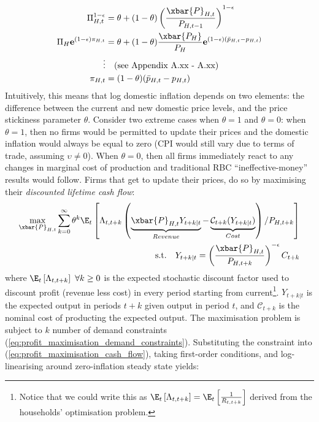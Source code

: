 \begin{align}
    \Pi_{H,t}^{1-\epsilon} &= \theta + (1-\theta)\left(\frac{\xbar{P}_{H,t}}{P_{H,t-1}}\right)^{1-\epsilon} \\
    \Pi_H \mathbf{e}^{(1-\epsilon)\pi_{H,t}} &= \theta + (1-\theta)\frac{\xbar{P_H}}{P_H}\mathbf{e}^{(1-\epsilon)(\bar{p}_{H,t} - p_{H,t})} \\
    \vdots & \quad \text{(see Appendix A.xx - A.xx)} \\
    \pi_{H,t} &= (1-\theta)(\bar{p}_{H,t} - p_{H,t}) \label{eq:domestic_inflation_new_price_relationship}
\end{align}
Intuitively, this means that log domestic inflation depends on two elements: the difference between the current and new domestic price levels, and the price stickiness parameter $\theta$. Consider two extreme cases when $\theta = 1$ and $\theta = 0$: when $\theta = 1$, then no firms would be permitted to update their prices and the domestic inflation would always be equal to zero (CPI would still vary due to terms of trade, assuming $\upsilon \ne 0$). When $\theta = 0$, then all firms immediately react to any changes in marginal cost of production and traditional RBC ``ineffective-money'' results would follow. Firms that get to update their prices, do so by maximising their \textit{discounted lifetime cash flow}:
\begin{align}
    \max_{\xbar{P}_{H,t}} \sum_{k=0}^{\infty} \theta^k \E_t \left[\Lambda_{t,t+k} \left( \underbrace{\xbar{P}_{H,t} Y_{t+k|t}}_{Revenue} - \underbrace{\mathcal{C}_{t+k}(Y_{t+k|t})}_{Cost} \right) / P_{H,t+k} \right] \label{eq:profit_maximisation_cash_flow}\\
    \text{s.t.} \quad Y_{t+k|t} = \left(\frac{\xbar{P}_{H,t}}{P_{H,t+k}}\right)^{-\epsilon} C_{t+k} \label{eq:profit_maximisation_demand_constraints}
\end{align}
where $\E_t \left[\Lambda_{t,t+k}\right]\ \forall k \geq 0$ is the expected stochastic discount factor used to discount profit (revenue less cost) in every period starting from current\footnote{Notice that we could write this as $\E_t \left[\Lambda_{t,t+k}\right]=\E_t \left[\frac{1}{R_{t, t+k}}\right]$ derived from the households' optimisation problem.}. $Y_{t+k|t}$ is the expected output in periods $t+k$ given output in period $t$, and $\mathcal{C}_{t+k}$ is the nominal cost of producting the expected output. The maximisation problem is subject to $k$ number of demand constraints (\ref{eq:profit_maximisation_demand_constraints}). Substituting the constraint into (\ref{eq:profit_maximisation_cash_flow}), taking first-order conditions, and log-linearising around zero-inflation steady state yields:
